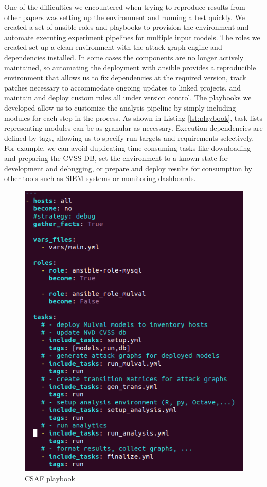 One of the difficulties we encountered when trying to reproduce results from other papers was setting up the environment and running a test quickly. We created a set of ansible\cite{Hall:2013:ACM:2601666} roles and playbooks to provision the environment and automate executing experiment pipelines for multiple input models. The roles we created set up a clean environment with the attack graph engine and dependencies installed. In some cases the components are no longer actively maintained, so automating the deployment with ansible provides a reproducible environment that allows us to fix dependencies at the required version, track patches necessary to accommodate ongoing updates to linked projects, and maintain and deploy custom rules all under version control. The playbooks we developed allow us to customize the analysis pipeline by simply including modules for each step in the process. As shown in Listing \ref{lst:playbook}, task lists representing modules can be as granular as necessary. Execution dependencies are defined by tags, allowing us to specify run targets and requirements selectively. For example, we can avoid duplicating time consuming tasks like downloading and preparing the CVSS DB, set the environment to a known state for development and debugging, or prepare and deploy results for consumption by other tools such as SIEM systems or monitoring dashboards. 

\begin{figure}[ht]
\centering
\includegraphics[width=.5\linewidth]{content/chapters/ch_background/sdn_analytics/2/figs/deploy_infra/play.png}
\caption{CSAF playbook}
\label{fig:play}
\end{figure} 

